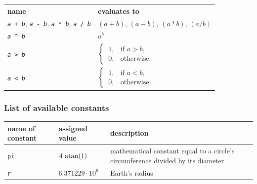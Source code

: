 \begin{tabular}{|p{3cm}|p{7cm}|}
  \hline
  name                              & evaluates to \\
  \hline\hline
  \raggedright%
  \texttt{\textit{a}~+~\textit{b}},
  \texttt{\textit{a}~-~\textit{b}},
  \texttt{\textit{a}~*~\textit{b}},
  \texttt{\textit{a}~/~\textit{b}}  & $(a+b)$, $(a-b)$, $(a*b)$, $(a/b)$ \\[0.5em]
  \texttt{\textit{a}~\^~\textit{b}} & $a^b$                              \\[0.5em]
  \texttt{\textit{a}~>~\textit{b}}  & $\begin{cases}
                                        ~  1, & \text{if } a > b, \\
                                        ~  0, & \text{otherwise}.
                                       \end{cases}$                      \\[1.5em]
  \texttt{\textit{a}~<~\textit{b}}  & $\begin{cases}
                                        ~  1, & \text{if } a < b, \\
                                        ~  0, & \text{otherwise}.
                                       \end{cases}$                      \\[0.5em]
  \hline
\end{tabular}



\subsubsection{List of available constants}

\begin{tabular}{|l|l|p{7cm}|}
  \hline
  name of constant & assigned value & description \\
  \hline\hline
  \texttt{pi} & $4 \, \operatorname{atan}(1)$     & mathematical constant equal to a circle's circumference
                                      divided by its diameter  \\
  \texttt{r}  & $6.371229\cdot10^6$ & Earth's radius\footnotemark[1]  \\
  \hline
\end{tabular}


